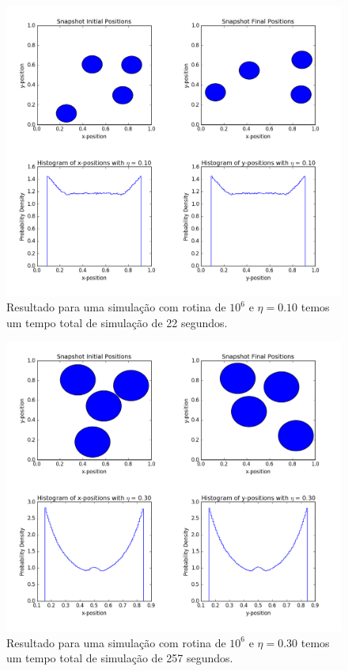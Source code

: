 \documentclass[%
reprint,
amsmath,amssymb,
aps,
12pt
]{revtex4-1}
\begin{document}
\begin{figure}[!h]
	\centering
	\includegraphics[scale=0.28]{mcd3.png}
	\caption{Resultado para uma simulação com rotina de $ 10^6 $ e $ \eta = 0.10 $ temos um tempo total de simulação de 22 segundos.
		\label{mcd3}}
\end{figure}
\clearpage
\begin{figure}[!h]
	\centering
	\includegraphics[scale=0.28]{mcd4.png}
	\caption{Resultado para uma simulação com rotina de $ 10^6 $ e $ \eta = 0.30 $ temos um tempo total de simulação de 257 segundos.
		\label{mcd4}}
\end{figure}
\end{document}
